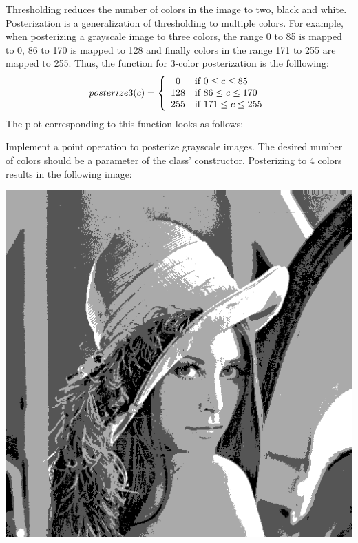 \documentclass{book}
\begin{document}
\begin{exercise}
Thresholding reduces the number of colors in the image to two, black and white. Posterization is a generalization of thresholding to multiple colors. For example, when posterizing a grayscale image to three colors, the range 0 to 85 is mapped to 0, 86 to 170 is mapped to 128 and finally colors in the  range 171 to 255 are mapped to 255. Thus, the function for 3-color posterization is the folllowing:
 $$posterize3(c) = \left\{\begin{array}{c l}
  0 & \text{if $0 \leq c \leq 85$}\\
  128 & \text{if $86 \leq c \leq 170$}\\
  255 & \text{if $171 \leq c \leq 255$}\\
\end{array}
\right.$$
The plot corresponding to this function looks as follows:
\begin{center}
\end{center}
Implement a point operation  to posterize grayscale images. The desired number of colors should be a parameter of the class' constructor. Posterizing  to 4 colors results in the following image:
\begin{center}
\includegraphics[scale=0.20]{lena-gray-posterized4.png}
\end{center}
\end{exercise}
\end{document}
